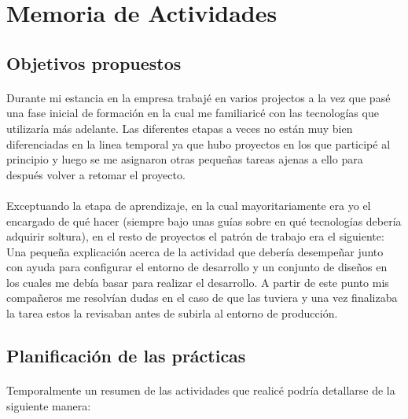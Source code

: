 \documentclass[11pt, a4paper,spanish]{article}
\begin{document}
    \section{Memoria de Actividades}

        \subsection{Objetivos propuestos}

            \paragraph{}
            Durante mi estancia en la empresa trabajé en varios projectos a la vez que pasé una fase inicial de formación en la cual me familiaricé con las tecnologías que utilizaría más adelante. Las diferentes etapas a veces no están muy bien diferenciadas en la linea temporal ya que hubo proyectos en los que participé al principio y luego se me asignaron otras pequeñas tareas ajenas a ello para después volver a retomar el proyecto.

            \paragraph{}
            Exceptuando la etapa de aprendizaje, en la cual mayoritariamente era yo el encargado de qué hacer (siempre bajo unas guías sobre en qué tecnologías debería adquirir soltura), en el resto de proyectos el patrón de trabajo era el siguiente: Una pequeña explicación acerca de la actividad que debería desempeñar junto con ayuda para configurar el entorno de desarrollo y un conjunto de diseños en los cuales me debía basar para realizar el desarrollo. A partir de este punto mis compañeros me resolvían dudas en el caso de que las tuviera y una vez finalizaba la tarea estos la revisaban antes de subirla al entorno de producción.


        \subsection{Planificación de las prácticas}

            \paragraph{}
            Temporalmente un resumen de las actividades que realicé podría detallarse de la siguiente manera:
\end{document}
